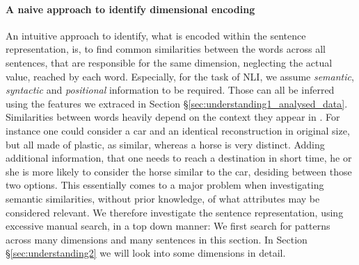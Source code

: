 \paragraph*{A naive approach to identify dimensional encoding}
An intuitive approach to identify, what is encoded within the sentence representation, is, to find common similarities between the words across all sentences, that are responsible for the same dimension, neglecting the actual value, reached by each word. Especially, for the task of \ac{NLI}, we assume \textit{semantic}, \textit{syntactic} and \textit{positional} information to be required. Those can all be inferred using the features we extraced in Section §\ref{sec:understanding1_analysed_data}. Similarities between words heavily depend on the context they appear in \citep{dagan2000contextual}. For instance one could consider a car and an identical reconstruction in original size, but all made of plastic, as similar, whereas a horse is very distinct. Adding additional information, that one needs to reach a destination in short time, he or she is more likely to consider the horse similar to the car, desiding between those two options. This essentially comes to a major problem when investigating semantic similarities, without prior knowledge, of what attributes may be considered relevant. We therefore investigate the sentence representation, using excessive manual search, in a top down manner: We first search for patterns across many dimensions and many sentences in this section. In Section §\ref{sec:understanding2} we will look into some dimensions in detail.

